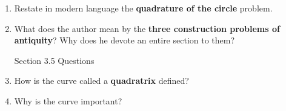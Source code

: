 \documentclass[12pt]{article}
\renewcommand{\emph}[1]{\textsf{\textbf{#1}}}
\begin{document}
\begin{enumerate}
\item Restate in modern language the \emph{quadrature of the circle} problem.\\
\vfill

\item What does the author mean by the \emph{three construction problems of antiquity}? Why does he devote an entire section to them?\\
\vfill


\begin{center} Section 3.5 Questions \end{center}

\item How is the curve called a \emph{quadratrix} defined?\\
\vfill

\item Why is the curve important?\\
\vfill


\end{enumerate}
\end{document}
